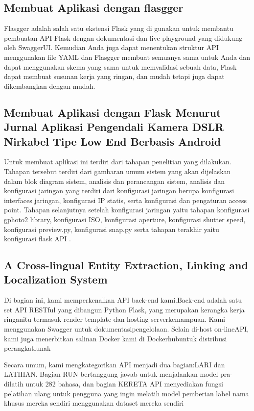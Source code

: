 \documentclass[12pt]{article}
\begin{document}
\subsection{Membuat Aplikasi dengan flasgger}
Flasgger adalah salah satu ekstensi Flask yang di gunakan untuk membantu pembuatan API Flask dengan dokumentasi dan live playground yang didukung oleh SwaggerUI. Kemudian Anda juga dapat menentukan struktur API menggunakan file YAML dan Flasgger membuat semuanya sama untuk Anda dan dapat menggunakan skema yang sama untuk memvalidasi sebuah data, Flask dapat membuat susunan kerja yang ringan, dan mudah tetapi juga dapat dikembangkan dengan mudah\cite{gunawan2018aplikasi}.

\subsection{Membuat Aplikasi dengan Flask Menurut Jurnal Aplikasi Pengendali Kamera DSLR Nirkabel Tipe Low End Berbasis Android}
Untuk membuat aplikasi ini terdiri dari tahapan penelitian yang dilakukan. Tahapan tersebut terdiri dari gambaran umum sistem yang akan dijelaskan dalam blok diagram sistem, analisis dan perancangan sistem, analisis dan konfigurasi jaringan yang terdiri dari konfigurasi jaringan berupa konfigurasi interfaces jaringan, konfigurasi IP statis, serta konfigurasi dan pengaturan access point. Tahapan selanjutnya setelah konfigurasi jaringan yaitu tahapan konfigurasi gphoto2 library, konfigurasi ISO, konfigurasi aperture, konfigurasi shutter speed, konfigurasi preview.py, konfigurasi snap.py serta tahapan terakhir yaitu konfigurasi flask API \cite{computingaplikasi}.


\subsection{A Cross-lingual Entity Extraction, Linking and Localization System}
Di bagian ini, kami memperkenalkan API back-end kami.Back-end adalah satu set API RESTful yang dibangun Python Flask, yang merupakan kerangka kerja ringanitu termasuk render template dan hosting serverkemampuan. Kami menggunakan Swagger untuk dokumentasipengelolaan. Selain di-host on-lineAPI, kami juga menerbitkan salinan Docker kami di Dockerhubuntuk distribusi perangkatlunak

Secara umum, kami mengkategorikan API menjadi dua bagian:LARI dan LATIHAN. Bagian RUN bertanggung jawab untuk menjalankan model pra-dilatih untuk 282 bahasa, dan bagian KERETA API menyediakan fungsi pelatihan ulang untuk pengguna yang ingin melatih model pemberian label nama khusus mereka sendiri menggunakan dataset mereka sendiri
\end{document}
